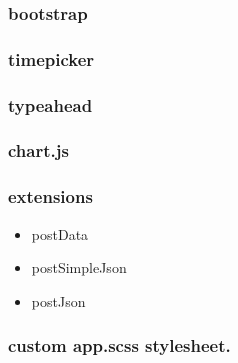 	\subsubsection{bootstrap}
	\subsubsection{timepicker}
	\subsubsection{typeahead}
	\subsubsection{chart.js}
	\subsubsection{extensions}
			\begin{itemize}
				\item postData
				\item postSimpleJson
				\item postJson
			\end{itemize}
	\subsubsection{custom app.scss stylesheet.}
